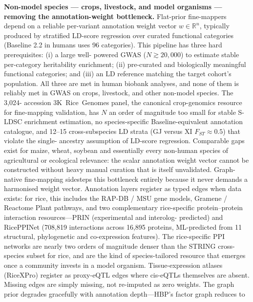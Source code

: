 \textbf{Non-model species --- crops, livestock, and model
organisms --- removing the annotation-weight bottleneck.}\label{disc:nonmodel} Flat-prior fine-mappers depend
on a reliable per-variant annotation weight vector
$w \in \mathbb{R}^n$, typically produced by stratified LD-score
regression over curated functional categories
(Baseline 2.2 in humans uses 96
categories)\cite{finucane2015partitioning,buliksullivan2015ld}.
This pipeline has three hard prerequisites: (i) a large well-
powered GWAS ($N \gtrsim 20{,}000$) to estimate stable
per-category heritability enrichment; (ii) pre-curated and
biologically meaningful functional categories; and (iii) an LD
reference matching the target cohort's population. All three
are met in human biobank analyses, and none of them is reliably
met in GWAS on crops, livestock, and other non-model species. The 3{,}024-
accession 3K~Rice~Genomes panel\cite{wang2018genomic}, the
canonical crop-genomics resource for fine-mapping validation,
has $N$ an order of magnitude too small for stable S-LDSC
enrichment estimation, no species-specific Baseline-equivalent
annotation catalogue, and 12--15 cross-subspecies LD strata
(GJ versus XI $F_{ST} \approx 0.5$) that violate the single-
ancestry assumption of LD-score regression. Comparable gaps
exist for maize, wheat, soybean and essentially every non-human
species of agricultural or ecological relevance: the scalar
annotation weight vector cannot be constructed without heavy
manual curation that is itself unvalidated. Graph-native
fine-mapping sidesteps this bottleneck entirely because it never
demands a harmonised weight vector. Annotation layers register
as typed edges when data exists: for rice, this includes the
RAP-DB / MSU gene models\cite{frankish2023gencode},
Gramene / Reactome Plant
pathways\cite{gillespie2022reactome}, and two complementary
rice-specific protein--protein interaction
resources---PRIN\cite{gu2011prin} (experimental and interolog-
predicted) and RicePPINet\cite{liu2017riceppinet} (708{,}819
interactions across 16{,}895 proteins, ML-predicted from 11
structural, phylogenetic and co-expression features). The
rice-specific PPI networks are nearly two orders of magnitude
denser than the STRING cross-species subset for rice, and are
the kind of species-tailored resource that emerges once a
community invests in a model organism. Tissue-expression
atlases (RiceXPro) register as proxy-eQTL edges where cis-eQTLs
themselves are absent. Missing edges are simply missing, not
re-imputed as zero weights. The graph prior degrades
gracefully with annotation depth---HBP's factor graph reduces to
